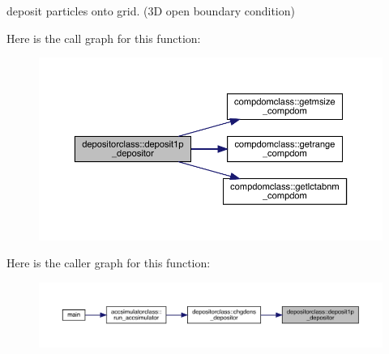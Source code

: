 deposit particles onto grid. (3D open boundary condition) 

Here is the call graph for this function\+:\nopagebreak
\begin{figure}[H]
\begin{center}
\leavevmode
\includegraphics[width=350pt]{namespacedepositorclass_a1f57e8a4537070af145a196172e3ba85_cgraph}
\end{center}
\end{figure}
Here is the caller graph for this function\+:\nopagebreak
\begin{figure}[H]
\begin{center}
\leavevmode
\includegraphics[width=350pt]{namespacedepositorclass_a1f57e8a4537070af145a196172e3ba85_icgraph}
\end{center}
\end{figure}
\mbox{\label{namespacedepositorclass_aaa31c3a30e6e83ab67ee89344612328c}} 
